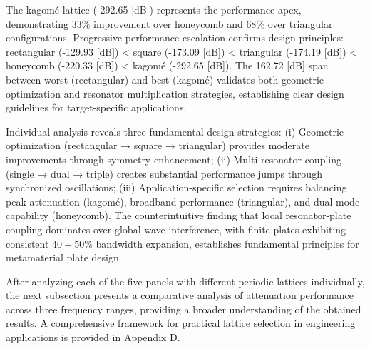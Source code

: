\documentclass[review,numbers,sort&compress]{elsarticle}
\begin{document}
{The kagomé lattice (-292.65 [dB]) represents the performance apex, demonstrating $33\%$ improvement over honeycomb and $68\%$ over triangular configurations. Progressive performance escalation confirms design principles: rectangular (-129.93 [dB]) < square (-173.09 [dB]) < triangular (-174.19 [dB]) < honeycomb (-220.33 [dB]) < kagomé (-292.65 [dB]). The 162.72 [dB] span between worst (rectangular) and best (kagomé) validates both geometric optimization and resonator multiplication strategies, establishing clear design guidelines for target-specific applications.

Individual analysis reveals three fundamental design strategies: (i) Geometric optimization (rectangular → square → triangular) provides moderate improvements through symmetry enhancement; (ii) Multi-resonator coupling (single → dual → triple) creates substantial performance jumps through synchronized oscillations; (iii) Application-specific selection requires balancing peak attenuation (kagomé), broadband performance (triangular), and dual-mode capability (honeycomb). The counterintuitive finding that local resonator-plate coupling dominates over global wave interference, with finite plates exhibiting consistent $40-50\%$ bandwidth expansion, establishes fundamental principles for metamaterial plate design.

After analyzing each of the five panels with different periodic lattices individually, the next subsection presents a comparative analysis of attenuation performance across three frequency ranges, providing a broader understanding of the obtained results. A comprehensive framework for practical lattice selection in engineering applications is provided in Appendix D.

}
\end{document}
